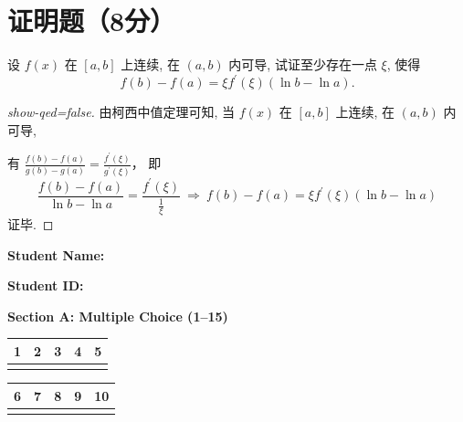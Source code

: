 \documentclass{CWNUExam}
\begin{document}
\section{证明题（8分）}

\begin{problem}
  设 $f(x)$ 在 $[a, b]$ 上连续, 在 $(a, b)$ 内可导, 试证至少存在一点 $\xi$, 使得
  $$f(b)-f(a)=\xi f^{\prime}(\xi)(\ln b-\ln a).$$
\end{problem}

\begin{proof}[show-qed=false]
  由柯西中值定理可知, 当 $f(x)$ 在 $[a, b]$ 上连续, 在 $(a, b)$ 内可导,

  有
  $\frac{f(b)-f(a)}{g(b)-g(a)}=\frac{f^{\prime}(\xi)}{g^{\prime}(\xi)}$，
  即
  $$\frac{f(b)-f(a)}{\ln b-\ln a}=\frac{f^{\prime}(\xi)}{\frac{1}{\xi}}
    ~\Rightarrow~
    f(b)-f(a)=\xi f^{\prime}(\xi)(\ln b-\ln a) $$
  证毕.
\end{proof}


\newpage

\noindent\textbf{Student Name:} \underline{\hspace{6cm}}

\textbf{Student ID:} \underline{\hspace{6cm}}

\vspace{0.6cm}
\noindent\textbf{Section A: Multiple Choice (1--15)}\\[0.2cm]
\noindent
\begin{tabular}{|c|c|c|c|c|}
\hline
1 & 2 & 3 & 4 & 5  \\
\hline
\underline{\hspace{1.6cm}} & \underline{\hspace{1.6cm}} & \underline{\hspace{1.6cm}} & \underline{\hspace{1.6cm}} & \underline{\hspace{1.6cm}}  \\
\hline
\end{tabular}

\begin{tabular}{|c|c|c|c|c|}
\hline
6 & 7 & 8 & 9 & 10  \\
\hline
\underline{\hspace{1.6cm}} & \underline{\hspace{1.6cm}} & \underline{\hspace{1.6cm}} & \underline{\hspace{1.6cm}} & \underline{\hspace{1.6cm}}  \\
\hline
\end{tabular}
\end{document}
